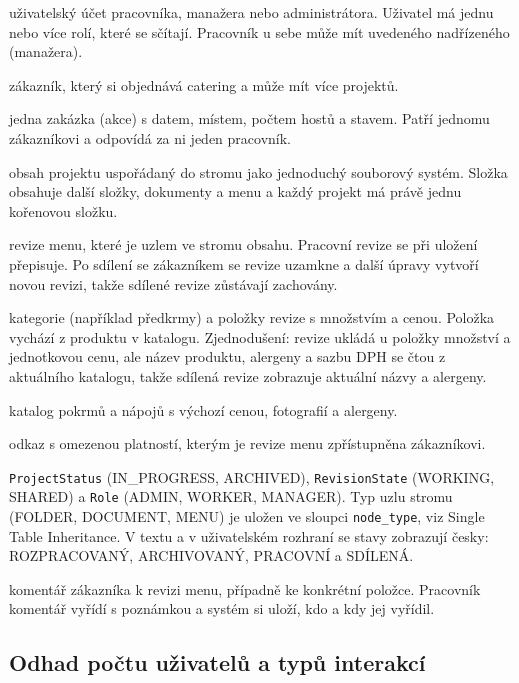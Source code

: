\begin{description}[itemsep=1pt]
  \item[User, Role] uživatelský účet pracovníka, manažera nebo administrátora. Uživatel má jednu nebo více rolí, které se sčítají. Pracovník u sebe může mít uvedeného nadřízeného (manažera).
  \item[Customer] zákazník, který si objednává catering a může mít více projektů.
  \item[Project] jedna zakázka (akce) s datem, místem, počtem hostů a stavem. Patří jednomu zákazníkovi a odpovídá za ni jeden pracovník.
  \item[ProjectNode, Folder, Document, Menu] obsah projektu uspořádaný do stromu jako jednoduchý souborový systém. Složka obsahuje další složky, dokumenty a menu a každý projekt má právě jednu kořenovou složku.
  \item[MenuRevision] revize menu, které je uzlem ve stromu obsahu. Pracovní revize se při uložení přepisuje. Po sdílení se zákazníkem se revize uzamkne a další úpravy vytvoří novou revizi, takže sdílené revize zůstávají zachovány.
  \item[MenuCategory, MenuItem] kategorie (například předkrmy) a položky revize s množstvím a cenou. Položka vychází z produktu v katalogu. Zjednodušení: revize ukládá u položky množství a jednotkovou cenu, ale název produktu, alergeny a sazbu DPH se čtou z aktuálního katalogu, takže sdílená revize zobrazuje aktuální názvy a alergeny.
  \item[Product, Allergen] katalog pokrmů a nápojů s výchozí cenou, fotografií a alergeny.
  \item[ShareLink] odkaz s omezenou platností, kterým je revize menu zpřístupněna zákazníkovi.
  \item[Výčtové typy] \texttt{ProjectStatus} (IN\_PROGRESS, ARCHIVED), \texttt{RevisionState} (WORKING, SHARED) a \texttt{Role} (ADMIN, WORKER, MANAGER). Typ uzlu stromu (FOLDER, DOCUMENT, MENU) je uložen ve sloupci \texttt{node\_type}, viz Single Table Inheritance. V textu a v uživatelském rozhraní se stavy zobrazují česky: ROZPRACOVANÝ, ARCHIVOVANÝ, PRACOVNÍ a SDÍLENÁ.
  \item[Comment] komentář zákazníka k revizi menu, případně ke konkrétní položce. Pracovník komentář vyřídí s poznámkou a systém si uloží, kdo a kdy jej vyřídil.
\end{description}

\subsection{Odhad počtu uživatelů a typů interakcí}

